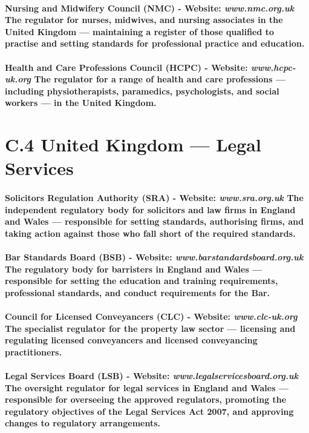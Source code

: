 \paragraph{\textbf{Nursing and Midwifery Council (NMC)} - Website: \textit{www.nmc.org.uk} The regulator for nurses, midwives, and nursing associates in the United Kingdom — maintaining a register of those qualified to practise and setting standards for professional practice and education.}
\paragraph{\textbf{Health and Care Professions Council (HCPC)} - Website: \textit{www.hcpc-uk.org} The regulator for a range of health and care professions — including physiotherapists, paramedics, psychologists, and social workers — in the United Kingdom.}

\section*{C.4 United Kingdom — Legal Services}
\paragraph{\textbf{Solicitors Regulation Authority (SRA)} - Website: \textit{www.sra.org.uk} The independent regulatory body for solicitors and law firms in England and Wales — responsible for setting standards, authorising firms, and taking action against those who fall short of the required standards.}
\paragraph{\textbf{Bar Standards Board (BSB)} - Website: \textit{www.barstandardsboard.org.uk} The regulatory body for barristers in England and Wales — responsible for setting the education and training requirements, professional standards, and conduct requirements for the Bar.}
\paragraph{\textbf{Council for Licensed Conveyancers (CLC)} - Website: \textit{www.clc-uk.org} The specialist regulator for the property law sector — licensing and regulating licensed conveyancers and licensed conveyancing practitioners.}
\paragraph{\textbf{Legal Services Board (LSB)} - Website: \textit{www.legalservicesboard.org.uk} The oversight regulator for legal services in England and Wales — responsible for overseeing the approved regulators, promoting the regulatory objectives of the Legal Services Act 2007, and approving changes to regulatory arrangements.}

